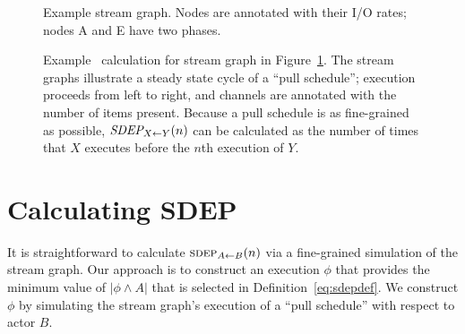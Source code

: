 \begin{figure}[t]
\begin{center}
\caption{{\small Example stream graph. Nodes are annotated with their
I/O rates; nodes A and E have two phases. \protect\label{fig:sdep-rates}}}
\end{center}
\vspace{-12pt}
\end{figure}

\begin{figure*}[t]
\begin{center}
\caption{\small Example \figsdep\ calculation for stream graph in
Figure~\ref{fig:sdep-rates}.  The stream graphs illustrate a steady
state cycle of a ``pull schedule''; execution proceeds from left to
right, and channels are annotated with the number of items present.
Because a pull schedule is as fine-grained as possible,
$\figsdepf{X}{Y}(n)$ can be calculated as the number of times that $X$
executes before the $n$th execution of $Y$.
\protect\label{fig:sdep1}}
\end{center}
\vspace{-12pt}
\end{figure*}

\section{Calculating SDEP}

It is straightforward to calculate $\sdepf{A}{B}(n)$ via a
fine-grained simulation of the stream graph.  Our approach is to
construct an execution $\phi$ that provides the minimum value of
$|\phi \wedge A|$ that is selected in Definition~\ref{eq:sdepdef}.  We
construct $\phi$ by simulating the stream graph's execution of a
``pull schedule'' with respect to actor $B$.

